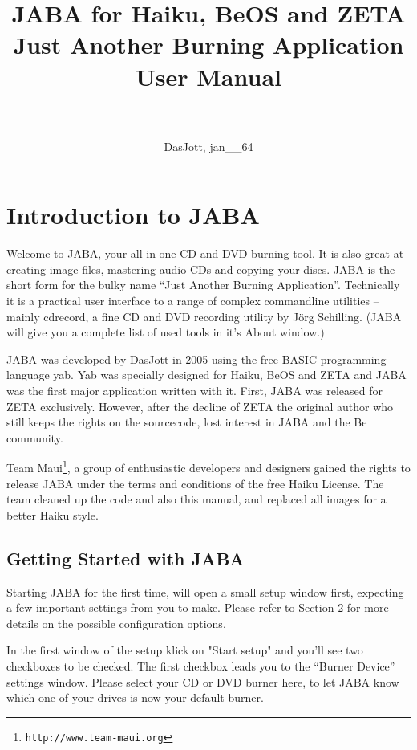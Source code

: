 \documentclass[a4paper,11pt]{article}
\title{JABA for Haiku, BeOS and ZETA \\ {\large Just Another Burning Application} \\ \vspace{2cm} User Manual\\ \vspace{10cm}\ }
\author{DasJott, jan\_\_64}
\begin{document}
\sloppy
\newcommand{\mybaselinestretch}{0.9}
\renewcommand{\baselinestretch}{\mybaselinestretch} 

\maketitle

\thispagestyle{empty}
\newpage

\tableofcontents
\newpage


\section{Introduction to JABA}

Welcome to JABA, your all-in-one CD and DVD burning tool. It is also great at creating image files,
mastering audio CDs and copying your discs. JABA is the short form for the bulky name ``Just Another Burning Application''. Technically it is a practical user interface to a range of
complex commandline utilities -- mainly cdrecord, a fine CD and DVD recording utility 
by J\"org Schilling. (JABA will give you a complete list of used tools in it's About window.)

JABA was developed by DasJott in 2005 using the free BASIC programming language yab. Yab was specially designed for Haiku, BeOS and ZETA and JABA was the first major application written with it. First, JABA was released for ZETA exclusively. However, after the decline of ZETA the original author who still keeps the rights on the sourcecode, lost interest in JABA and the Be community.

Team Maui\footnote{\tt http://www.team-maui.org}, a group of enthusiastic developers and designers gained the rights to release JABA under the terms and conditions of the free Haiku License. The team cleaned up the code and also this manual, and replaced all images for a better Haiku style.

\subsection{Getting Started with JABA}

Starting JABA for the first time, will open a small setup window first, expecting a few
important settings from you to make. Please refer to Section 2 for more details on the
possible configuration options.

In the first window of the setup klick on "Start setup" and you'll see two checkboxes to
be checked.
The first checkbox leads you to the ``Burner Device'' settings window. Please select your
CD or DVD burner here, to let JABA know which one of your drives is now your default burner.
\end{document}
